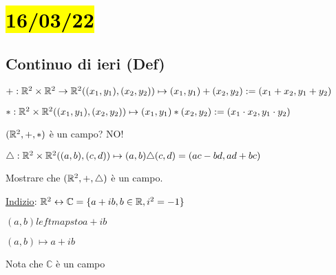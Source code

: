 \documentclass{article}
\begin{document}
\section{\hl{16/03/22}}
\subsection*{Continuo di ieri (Def)}
\hspace*{1.3em}$+:\mathbb{R}^2\times\mathbb{R}^2\rightarrow\mathbb{R}^2\\
	((x_1,y_1),(x_2,y_2))\mapsto(x_1,y_1)+(x_2,y_2):=(x_1+x_2,y_1+y_2)$

$*:\mathbb{R}^2\times\mathbb{R}^2\\
	((x_1,y_1),(x_2,y_2))\mapsto(x_1,y_1)*(x_2,y_2):=(x_1\cdot x_2,y_1\cdot y_2)$

$(\mathbb{R}^2,+,*)$ è un campo? NO!

$\triangle:\mathbb{R}^2\times\mathbb{R}^2\\
	((a,b),(c,d))\mapsto(a,b)\triangle(c,d)=(ac-bd,ad+bc)$

Mostrare che $(\mathbb{R}^2,+,\triangle)$ è un campo.

\ul{Indizio}: $\mathbb{R}^2\leftrightarrow\mathbb{C}=\{a+ib,b\in\mathbb{R},i^2=-1\}$

$(a,b)leftmapsto a+ib$

$(a,b)\mapsto a+ib$

Nota che $\mathbb{C}$ è un campo
\end{document}
